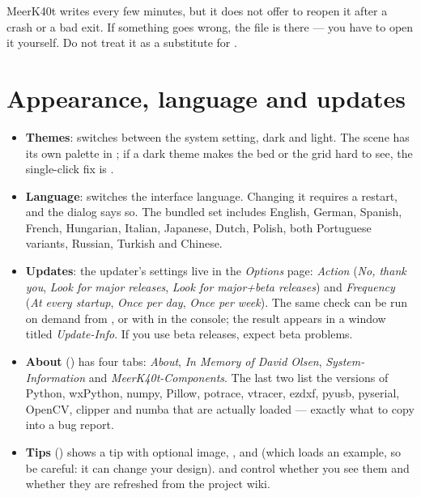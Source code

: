 \begin{warnbox}
MeerK40t writes  every few minutes, but it does not offer to
reopen it after a crash or a bad exit. If something goes wrong, the file is there
--- you have to open it yourself. Do not treat it as a substitute for
.
\end{warnbox}

\section{Appearance, language and updates}

\begin{itemize}
  \item \textbf{Themes}:  switches between the system setting,
        dark and light. The scene has its own palette in ; if a
        dark theme makes the bed or the grid hard to see, the single-click fix is
        .
  \item \textbf{Language}:  switches the interface language.
        Changing it requires a restart, and the dialog says so. The bundled set
        includes English, German, Spanish, French, Hungarian, Italian, Japanese,
        Dutch, Polish, both Portuguese variants, Russian, Turkish and Chinese.
  \item \textbf{Updates}: the updater's settings live in the \emph{Options} page:
        \emph{Action} (\emph{No, thank you}, \emph{Look for major releases},
        \emph{Look for major+beta releases}) and \emph{Frequency} (\emph{At every
        startup}, \emph{Once per day}, \emph{Once per week}). The same check can
        be run on demand from , or with
         in the console; the result appears in a window
        titled \emph{Update-Info}. If you use beta releases, expect beta
        problems.
  \item \textbf{About} () has four tabs: \emph{About},
        \emph{In Memory of David Olsen}, \emph{System-Information} and
        \emph{MeerK40t-Components}. The last two list the versions of Python,
        wxPython, numpy, Pillow, potrace, vtracer, ezdxf, pyusb, pyserial, OpenCV,
        clipper and numba that are actually loaded --- exactly what to copy into a
        bug report.
  \item \textbf{Tips} () shows a tip with optional
        image, ,  and  (which
        loads an example, so be careful: it can change your design).  and  control whether you see
        them and whether they are refreshed from the project wiki.
\end{itemize}

